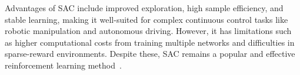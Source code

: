 \noindent  Advantages of {\gls{SAC}} include improved exploration, high sample efficiency, and stable learning, making it well-suited for complex continuous control tasks like robotic manipulation and autonomous driving. However, it has limitations such as higher computational costs from training multiple networks and difficulties in sparse-reward environments. Despite these, \gls{SAC} remains a popular and effective reinforcement learning method~\cite{haarnoja2018softactorcriticoffpolicymaximum, haarnoja2019sacapplications}.